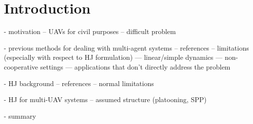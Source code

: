 \section{Introduction}
- motivation
-- UAVs for civil purposes
-- difficult problem

- previous methods for dealing with multi-agent systems
-- references
-- limitations (especially with respect to HJ formulation)
--- linear/simple dynamics
--- non-cooperative settings
--- applications that don't directly address the problem

- HJ background
-- references
-- normal limitations

- HJ for multi-UAV systems
-- assumed structure (platooning, SPP)

- summary